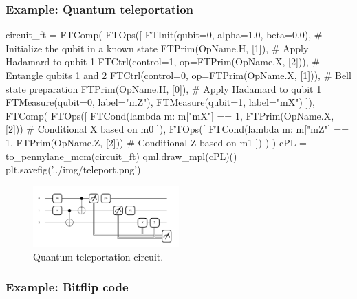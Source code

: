 \subsubsection{Example: Quantum teleportation}

  \begin{python}
  circuit_ft = FTComp(
    FTOps([
      FTInit(qubit=0, alpha=1.0, beta=0.0),         # Initialize the qubit in a known state
      FTPrim(OpName.H, [1]),                        # Apply Hadamard to qubit 1
      FTCtrl(control=1, op=FTPrim(OpName.X, [2])),  # Entangle qubits 1 and 2
      FTCtrl(control=0, op=FTPrim(OpName.X, [1])),  # Bell state preparation
      FTPrim(OpName.H, [0]),                        # Apply Hadamard to qubit 1
      FTMeasure(qubit=0, label="mZ"),
      FTMeasure(qubit=1, label="mX")
    ]),
    FTComp(
      FTOps([
        FTCond(lambda m: m["mX"] == 1, FTPrim(OpName.X, [2]))  # Conditional X based on m0
      ]),
      FTOps([
        FTCond(lambda m: m["mZ"] == 1, FTPrim(OpName.Z, [2]))  # Conditional Z based on m1
      ])
    )
  )
  cPL = to_pennylane_mcm(circuit_ft)
  qml.draw_mpl(cPL)()
  plt.savefig('../img/teleport.png')
  \end{python}

\begin{figure}[h!]
  \centering
  \includegraphics[width=0.5\textwidth]{../img/teleport.png}
  \caption{Quantum teleportation circuit.}
  \label{fig:teleport}
\end{figure}


\subsubsection{Example: Bitflip code}


